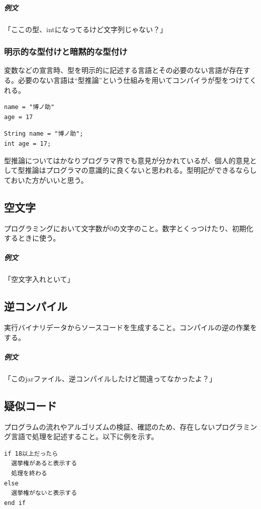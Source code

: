 \documentclass[a4paper]{ltjsreport}
\begin{document}
\subparagraph{例文} 「ここの型、intになってるけど文字列じゃない？」

\subsubsection{明示的な型付けと暗黙的な型付け}
変数などの宣言時、型を明示的に記述する言語とその必要のない言語が存在する。必要のない言語は``型推論''という仕組みを用いてコンパイラが型をつけてくれる。

\lstset{language=Ruby}
\begin{lstlisting}[caption=型推論を行う言語の例（Ruby）]
name = "博ノ助"
age = 17
\end{lstlisting}

\lstset{language=Java}
\begin{lstlisting}[caption=型推論を行なわない言語の例（Java）]
String name = "博ノ助";
int age = 17;
\end{lstlisting}

型推論についてはかなりプログラマ界でも意見が分かれているが、個人的意見として型推論はプログラマの意識的に良くないと思われる。型明記ができるならしておいた方がいいと思う。

\subsection{空文字}
プログラミングにおいて文字数が0の文字のこと。数字とくっつけたり、初期化するときに使う。

\subparagraph{例文} 「空文字入れといて」

\subsection{逆コンパイル}
実行バイナリデータからソースコードを生成すること。コンパイルの逆の作業をする。

\subparagraph{例文} 「このjarファイル、逆コンパイルしたけど間違ってなかったよ？」

\subsection{疑似コード}
プログラムの流れやアルゴリズムの検証、確認のため、存在しないプログラミング言語で処理を記述すること。以下に例を示す。

\lstset{language=}
\begin{lstlisting}
if 18以上だったら
  選挙権があると表示する
  処理を終わる
else
  選挙権がないと表示する
end if
\end{lstlisting}
\end{document}
